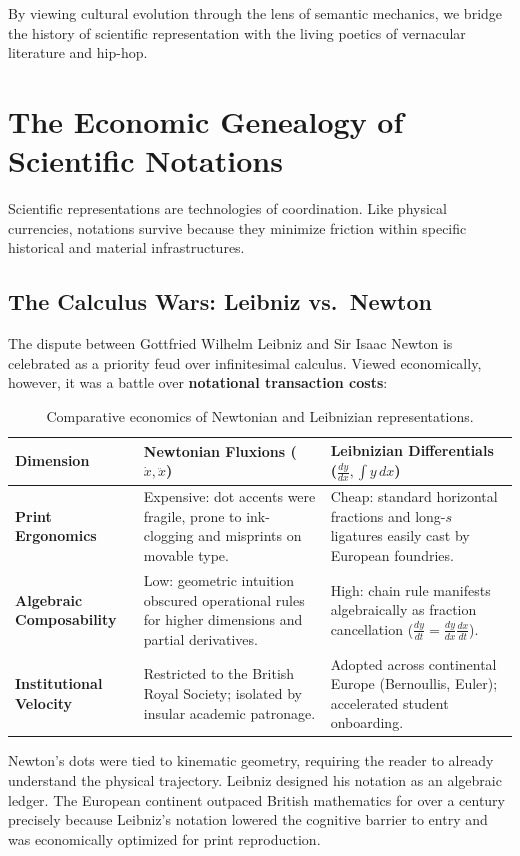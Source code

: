 \documentclass[11pt]{article}
\begin{document}
By viewing cultural evolution through the lens of semantic mechanics, we bridge the history of scientific representation with the living poetics of vernacular literature and hip-hop.

\section{The Economic Genealogy of Scientific Notations}

Scientific representations are technologies of coordination. Like physical currencies, notations survive because they minimize friction within specific historical and material infrastructures.

\subsection{The Calculus Wars: Leibniz vs.\ Newton}
The dispute between Gottfried Wilhelm Leibniz and Sir Isaac Newton is celebrated as a priority feud over infinitesimal calculus. Viewed economically, however, it was a battle over \textbf{notational transaction costs}:

\begin{table}[h]
\centering
\small
\begin{tabularx}{\textwidth}{lXX}
\toprule
\textbf{Dimension} & \textbf{Newtonian Fluxions ($\dot{x}, \ddot{x}$)} & \textbf{Leibnizian Differentials ($\frac{dy}{dx}, \int y\,dx$)} \\
\midrule
\textbf{Print Ergonomics} & Expensive: dot accents were fragile, prone to ink-clogging and misprints on movable type. & Cheap: standard horizontal fractions and long-$s$ ligatures easily cast by European foundries. \\
\textbf{Algebraic Composability} & Low: geometric intuition obscured operational rules for higher dimensions and partial derivatives. & High: chain rule manifests algebraically as fraction cancellation ($\frac{dy}{dt} = \frac{dy}{dx} \frac{dx}{dt}$). \\
\textbf{Institutional Velocity} & Restricted to the British Royal Society; isolated by insular academic patronage. & Adopted across continental Europe (Bernoullis, Euler); accelerated student onboarding. \\
\bottomrule
\end{tabularx}
\caption{Comparative economics of Newtonian and Leibnizian representations.}
\label{tab:calculus_war}
\end{table}

Newton's dots were tied to kinematic geometry, requiring the reader to already understand the physical trajectory. Leibniz designed his notation as an algebraic ledger. The European continent outpaced British mathematics for over a century precisely because Leibniz's notation lowered the cognitive barrier to entry and was economically optimized for print reproduction.
\end{document}
